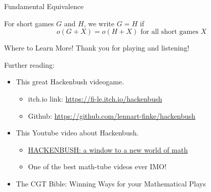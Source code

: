 \documentclass{beamer}
\begin{document}
\begin{frame}{Fundamental Equivalence}
    \begin{definition}
        For short games $G$ and $H$, we write $G = H$ if  
        $$o(G+X) = o(H+X) \text{ for all short games } X$$
    \end{definition}
\end{frame}

\begin{frame}{Where to Learn More!}
    Thank you for playing and listening!
    \vspace{10mm}
    
    
    Further reading:
    \begin{itemize}
        \item This great Hackenbush videogame.
            \begin{itemize}
                \item itch.io link: \href{https://fi-le.itch.io/hackenbush}{https://fi-le.itch.io/hackenbush}
                \item Github: \href{https://github.com/lennart-finke/hackenbush}{https://github.com/lennart-finke/hackenbush}
            \end{itemize}
        \item This Youtube video about Hackenbush. 
            \begin{itemize}
                \item \href{https://www.youtube.com/watch?v=ZYj4NkeGPdM}{HACKENBUSH: a window to a new world of math}
                \item One of the best math-tube videos ever IMO!
            \end{itemize}
        \item The CGT Bible: Winning Ways for your Mathematical Plays
    \end{itemize}
\end{frame}
\end{document}
